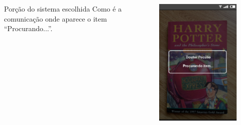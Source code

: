 \documentclass[14pt,beamer]{beamer}
\begin{document}
\begin{frame}
    \begin{columns}
        \begin{column}{.6\textwidth}
            \begin{block}{Porção do sistema escolhida}
                Como é a comunicação onde aparece o item 
            ``Procurando...''.
            \end{block}
        \end{column}
        \begin{column}{.4\textwidth}
            \begin{figure}
                \centering
                \includegraphics[scale=.5]{tela/TelaBuscando}
            \end{figure}
        \end{column}
    \end{columns}
\end{frame}
\end{document}
